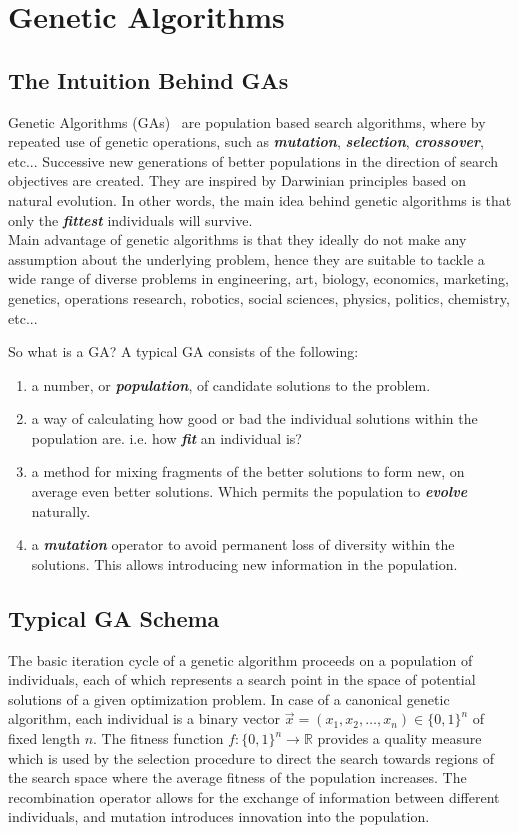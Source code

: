 \documentclass[12pt]{article}
\newcommand{\textem}[1]{\textbf{\textit{#1}}}
\begin{document}
\section{Genetic Algorithms}
\subsection{The Intuition Behind GAs}
Genetic Algorithms (GAs)~\cite{goldberg1989genetic} are population based
search algorithms, where by repeated use of genetic operations,
such as \textem{mutation}, \textem{selection}, \textem{crossover}, etc...
Successive new generations of better populations in the direction of
search objectives are created. They are inspired by Darwinian principles
based on natural evolution. In other words, the main idea behind genetic
algorithms is that only the \textem{fittest} individuals will survive.\\
Main advantage of genetic algorithms is that they ideally do not make
any assumption about the underlying problem, hence they are suitable to tackle
a wide range of diverse problems in
engineering, art, biology, economics, marketing, genetics,
operations research, robotics, social sciences, physics, politics, chemistry,
etc...

\noindent
So what is a GA? A typical GA consists of the following:
\vspace{-5mm}
\begin{enumerate}
\setlength{\parskip}{0em}
\item a number, or \textem{population}, of candidate solutions to the problem.
\item a way of calculating how good or bad the individual solutions within the
population are. i.e. how \textem{fit} an individual is?
\item a method for mixing fragments of the better solutions to form new, on
average even better solutions. Which permits the population to \textem{evolve} naturally.
\item a \textem{mutation} operator to avoid permanent loss of diversity within the
solutions. This allows introducing new information in the population.
\end{enumerate}

\subsection{Typical GA Schema}
The basic iteration cycle of a genetic algorithm proceeds on a population
of individuals, each of which represents a search point in the space
of potential solutions of a given optimization problem.
In case of a canonical genetic algorithm, each individual is a binary vector
$ \vec{x} = ( x_1, x_2, \dots, x_n ) \in \{0, 1\}^n $
of fixed length $n$. The fitness function
$ f: \{0, 1\}^n \rightarrow \mathbb{R} $
provides a quality measure which is used by the selection procedure to direct
the search towards regions of the search space where the
average fitness of the population increases. The recombination operator
allows for the exchange of information between different individuals, and
mutation introduces innovation into the population.
\end{document}
